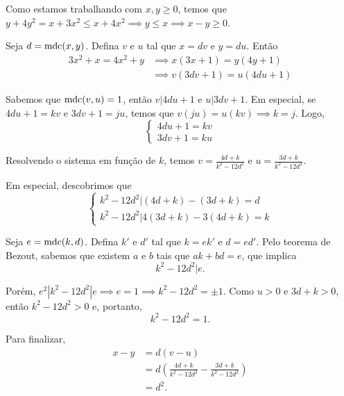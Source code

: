 Como estamos trabalhando com $x, y \ge 0$, temos que $y + 4y^2 = x + 3x^2 \le x + 4x^2 \implies y \le x \implies x - y \ge 0$.

Seja $d = \operatorname{mdc}(x, y)$. Defina $v$ e $u$ tal que $x = dv$ e $y = du$. Então
\begin{align*}
	3x^2 + x = 4x^2 + y &\implies x(3x + 1) = y(4y + 1)\\
						&\implies v(3dv + 1) = u(4du + 1)
\end{align*}

Sabemos que $\operatorname{mdc}(v, u) = 1$, então $v | 4du + 1$ e $u | 3dv + 1$. Em especial, se $4du + 1 = kv$ e $3dv + 1 = ju$, temos que $v(ju) = u(kv) \implies k = j$. Logo, \[
\begin{cases}
	4du + 1 = kv\\
	3dv + 1 = ku
\end{cases}\]

Resolvendo o sistema em função de $k$, temos $v = \frac{4d + k}{k^2 - 12d^2}$ e $u = \frac{3d + k}{k^2 - 12d^2}$.

Em especial, descobrimos que \[
\begin{cases}
	k^2 - 12d^2 | (4d + k) - (3d + k) = d\\
	k^2 - 12d^2 | 4(3d + k) - 3(4d + k) = k
\end{cases}\]

Seja $e = \operatorname{mdc}(k, d)$. Defina $k'$ e $d'$ tal que $k = ek'$ e $d = ed'$. Pelo teorema de Bezout, sabemos que existem $a$ e $b$ tais que $ak + bd = e$, que implica \[k^2 - 12d^2 | e.\]

Porém, $e^2 | k^2 - 12d^2 | e \implies e = 1 \implies k^2 - 12d^2 = \pm1$. Como $u > 0$ e $3d + k > 0$, então $k^2 - 12d^2 > 0$ e, portanto, \[k^2 - 12d^2 = 1.\]

Para finalizar,
\begin{align*}
	x - y &= d(v - u) \\
	      &= d\left(\frac{4d + k}{k^2 - 12d^2} - \frac{3d + k}{k^2 - 12d^2}\right) \\
		  &= d^2.
\end{align*}
